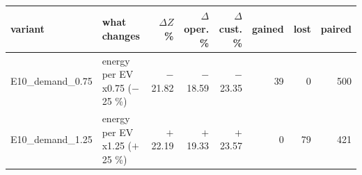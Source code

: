 \footnotesize
\begin{adjustbox}{max width=\linewidth}
\begin{tabular}{@{}llrrrrrr@{}}
\toprule
variant & what changes & \shortstack{$\Delta Z$\\\%} & \shortstack{$\Delta$\\oper. \%} & \shortstack{$\Delta$\\cust. \%} & gained & lost & paired \\
\midrule
E10\_demand\_0.75 & energy per EV x0.75 ($-$25 \%) & $-$21.82 & $-$18.59 & $-$23.35 & 39 & 0 & 500 \\
E10\_demand\_1.25 & energy per EV x1.25 ($+$25 \%) & $+$22.19 & $+$19.33 & $+$23.57 & 0 & 79 & 421 \\
\bottomrule
\end{tabular}
\end{adjustbox}
